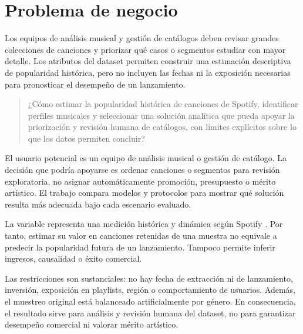 \section{Problema de negocio}

Los equipos de análisis musical y gestión de catálogos deben revisar grandes colecciones de
canciones y priorizar qué casos o segmentos estudiar con mayor detalle. Los atributos del dataset
permiten construir una estimación descriptiva de popularidad histórica, pero no incluyen las
fechas ni la exposición necesarias para pronosticar el desempeño de un lanzamiento.

\begin{quote}
¿Cómo estimar la popularidad histórica de canciones de Spotify, identificar perfiles musicales y
seleccionar una solución analítica que pueda apoyar la priorización y revisión humana de catálogos,
con límites explícitos sobre lo que los datos permiten concluir?
\end{quote}

El usuario potencial es un equipo de análisis musical o gestión de catálogo. La decisión que podría
apoyarse es ordenar canciones o segmentos para revisión exploratoria, no asignar automáticamente
promoción, presupuesto o mérito artístico. El trabajo compara modelos y protocolos para mostrar qué
solución resulta más adecuada bajo cada escenario evaluado.

La variable  representa una medición histórica y dinámica según Spotify
\citep{spotify_track_api}. Por tanto, estimar su valor en canciones retenidas de una muestra no
equivale a predecir la popularidad futura de un lanzamiento. Tampoco permite inferir ingresos,
causalidad o éxito comercial.

Las restricciones son sustanciales: no hay fecha de extracción ni de lanzamiento, inversión,
exposición en playlists, región o comportamiento de usuarios. Además, el muestreo original está
balanceado artificialmente por género. En consecuencia, el resultado sirve para análisis y revisión
humana del dataset, no para garantizar desempeño comercial ni valorar mérito artístico.
